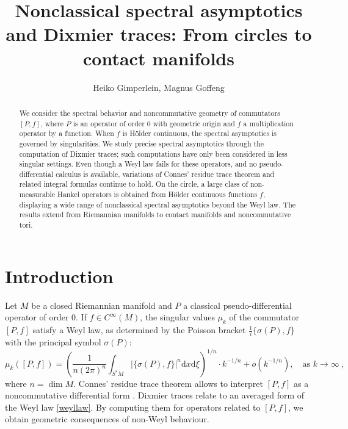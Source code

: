 \documentclass[10pt]{amsart}
\title[Nonclassical spectral asymptotics and Dixmier traces]{Nonclassical spectral asymptotics and Dixmier traces: From circles to contact manifolds}
\author{Heiko Gimperlein, Magnus Goffeng}
\theoremstyle{remark}
\theoremstyle{definition}
\begin{document}
\maketitle

\begin{abstract}

We consider the spectral behavior and noncommutative geometry of commutators $[P,f]$, where $P$ is an operator of order $0$ with geometric origin and $f$ a multiplication operator by a function. When $f$ is H\"{o}lder continuous, the spectral asymptotics is governed by singularities. We study precise spectral asymptotics through the computation of Dixmier traces; such computations have only been considered in less singular settings. Even though a Weyl law fails for these operators, and no pseudo-differential calculus is available, variations of Connes' residue trace theorem and related integral formulas continue to hold. On the circle, a large class of non-measurable Hankel operators is obtained from H\"older continuous functions $f$, displaying a wide range of nonclassical spectral asymptotics beyond the Weyl law. The results extend from Riemannian manifolds to contact manifolds and noncommutative tori.
\end{abstract}

\large
\section{Introduction}
\normalsize

Let $M$ be a closed Riemannian manifold and $P$ a classical pseudo-differential operator of order $0$. If $f \in C^\infty(M)$, the singular values $\mu_k$ of the commutator $[P,f]$ satisfy a Weyl law, as determined by the Poisson bracket $\frac{1}{i}\{\sigma(P), f\}$ with the principal symbol $\sigma(P)$: 
\begin{equation}
\label{weyllaw}
\mu_k([P,f])= \left(\frac{1}{n(2\pi)^n}\int_{S^*M} |\{\sigma(P),f\}|^n{\mathrm{d}} x {\mathrm{d}} \xi\right)^{1/n} \cdot k^{-1/n}+o(k^{-1/n}),\quad\mbox{as $k\to\infty$}\ ,
\end{equation}
where $n = \dim M$. Connes' residue trace theorem allows to interpret $[P,f]$ as a noncommutative differential form \cite{connesaction, c}. Dixmier traces relate to an averaged form of the Weyl law \eqref{weyllaw}. By computing them for operators related to $[P,f]$, we obtain geometric consequences of non-Weyl behaviour.   \\
\end{document}
